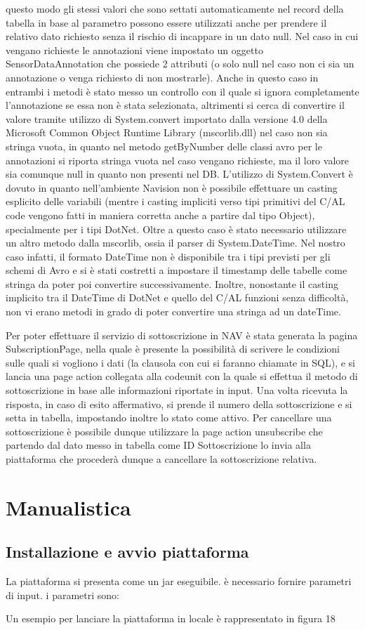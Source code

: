 questo modo gli stessi valori che sono settati automaticamente nel record della tabella in base al parametro possono essere utilizzati anche per prendere il relativo dato richiesto senza il rischio di incappare in un dato null. Nel caso in cui vengano richieste le annotazioni viene impostato un oggetto SensorDataAnnotation che possiede 2 attributi (o solo null nel caso non ci sia un annotazione o venga richiesto di non mostrarle). Anche in questo caso in entrambi i metodi è stato messo un controllo con il quale si ignora completamente l’annotazione se essa non è stata selezionata, altrimenti si cerca di convertire il valore tramite utilizzo di System.convert importato dalla versione 4.0 della Microsoft Common Object Runtime Library (mscorlib.dll) nel caso non sia stringa vuota, in quanto nel metodo getByNumber delle classi avro per le annotazioni si riporta stringa vuota nel caso vengano richieste, ma il loro valore sia comunque null in quanto non presenti nel DB. L’utilizzo di System.Convert è dovuto in quanto nell’ambiente Navision non è possibile effettuare un casting esplicito delle variabili (mentre i casting impliciti verso tipi primitivi del C/AL code vengono fatti in maniera corretta anche a partire dal tipo Object), specialmente per i tipi DotNet. Oltre a questo caso è stato necessario utilizzare un altro metodo dalla mscorlib, ossia il parser di System.DateTime. Nel nostro caso infatti, il formato DateTime non è disponibile tra i tipi previsti per gli schemi di Avro e si è stati costretti a impostare il timestamp delle tabelle come stringa da poter poi convertire successivamente. Inoltre, nonostante il casting implicito tra il DateTime di DotNet e quello del C/AL funzioni senza difficoltà, non vi erano metodi in grado di poter convertire una stringa ad un dateTime.

Per poter effettuare il servizio di sottoscrizione in NAV è stata generata la pagina SubscriptionPage, nella quale è presente la possibilità di scrivere le condizioni sulle quali si vogliono i dati (la clausola con cui si faranno chiamate in SQL), e si lancia una page action collegata alla codeunit con la quale si effettua il metodo di sottoscrizione in base alle informazioni riportate in input. Una volta ricevuta la risposta, in caso di esito affermativo, si prende il numero della sottoscrizione e si setta in tabella, impostando inoltre lo stato come attivo. Per cancellare una sottoscrizione è possibile dunque utilizzare la page action unsubscribe che partendo dal dato messo in tabella come ID Sottoscrizione lo invia alla piattaforma che procederà dunque a cancellare la sottoscrizione relativa. 

\section{Manualistica}
\subsection{Installazione e avvio piattaforma}
La piattaforma si presenta come un jar eseguibile. è necessario fornire parametri di input. i parametri sono:
{\selectfont
	
}
Un esempio per lanciare la piattaforma in locale è rappresentato in figura 18

